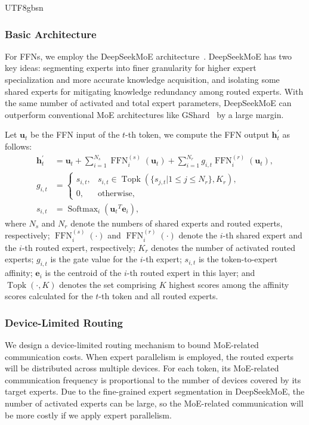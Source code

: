 \documentclass[11pt, a4paper, logo, copyright, nonumbering]{deepseek}
\newcommand{\dsmoe}{DeepSeekMoE}
\renewcommand{\leq}{\leqslant}
\begin{document}
\begin{CJK*}{UTF8}{gbsn}
\subsubsection{Basic Architecture}

For FFNs, we employ the \dsmoe{} architecture~\citep{deepseekmoe}. 
\dsmoe{} has two key ideas: segmenting experts into finer granularity for higher expert specialization and more accurate knowledge acquisition, and isolating some shared experts for mitigating knowledge redundancy among routed experts. 
With the same number of activated and total expert parameters, \dsmoe{} can outperform conventional MoE architectures like GShard~\citep{gshard} by a large margin. 

Let $\mathbf{u}_{t}$ be the FFN input of the $t$-th token, we compute the FFN output $\mathbf{h}_{t}^{\prime}$ as follows:
\begin{align}
    \mathbf{h}_{t}^{\prime} & = \mathbf{u}_{t} + \sum_{i=1}^{N_{s}} {\operatorname{FFN}^{(s)}_{i}\left( \mathbf{u}_{t} \right)} + \sum_{i=1}^{N_r} {g_{i,t} \operatorname{FFN}^{(r)}_{i}\left( \mathbf{u}_{t} \right)}, \\
    g_{i,t} & = \begin{cases} 
    s_{i,t}, & s_{i,t} \in \operatorname{Topk} (\{ s_{j, t} | 1 \leq j \leq N_r \}, K_{r}), \\
    0, & \text{otherwise}, 
    \end{cases} \\
    s_{i,t} & = \operatorname{Softmax}_i \left( {\mathbf{u}_{t}}^{T} \mathbf{e}_{i} \right),
\end{align}
where $N_{s}$ and $N_r$ denote the numbers of shared experts and routed experts, respectively; 
$\operatorname{FFN}^{(s)}_{i}(\cdot)$ and $\operatorname{FFN}^{(r)}_{i}(\cdot)$ denote the $i$-th shared expert and the $i$-th routed expert, respectively; 
$K_{r}$ denotes the number of activated routed experts; 
$g_{i,t}$ is the gate value for the $i$-th expert; 
$s_{i,t}$ is the token-to-expert affinity; 
$\mathbf{e}_{i}$ is the centroid of the $i$-th routed expert in this layer; 
and $\operatorname{Topk}(\cdot, K)$ denotes the set comprising $K$ highest scores among the affinity scores calculated for the $t$-th token and all routed experts.

\subsubsection{Device-Limited Routing}

We design a device-limited routing mechanism to bound MoE-related communication costs. 
When expert parallelism is employed, the routed experts will be distributed across multiple devices. 
For each token, its MoE-related communication frequency is proportional to the number of devices covered by its target experts.
Due to the fine-grained expert segmentation in \dsmoe{}, the number of activated experts can be large, so the MoE-related communication will be more costly if we apply expert parallelism. 


\end{CJK*}
\end{document}
